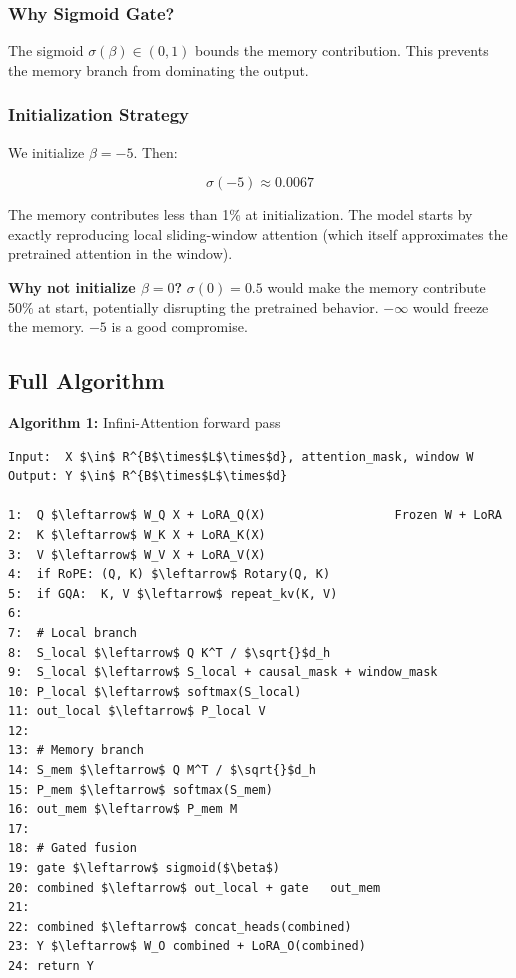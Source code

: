 \subsubsection{Why Sigmoid Gate?}

The sigmoid $\sigma(\beta) \in (0, 1)$ bounds the memory contribution. This 
prevents the memory branch from dominating the output.

\subsubsection{Initialization Strategy}

We initialize $\beta = -5$. Then:

\[
\sigma(-5) \approx 0.0067
\tag{4.8}
\]

The memory contributes less than 1\% at initialization. The model starts 
by exactly reproducing local sliding-window attention (which itself 
approximates the pretrained attention in the window).

\textbf{Why not initialize $\beta = 0$?} $\sigma(0) = 0.5$ would make the memory 
contribute 50\% at start, potentially disrupting the pretrained behavior. 
$-\infty$ would freeze the memory. $-5$ is a good compromise.

\subsection{Full Algorithm}

\textbf{Algorithm 1:} Infini-Attention forward pass
\begin{lstlisting}
Input:  X $\in$ R^{B$\times$L$\times$d}, attention_mask, window W
Output: Y $\in$ R^{B$\times$L$\times$d}

1:  Q $\leftarrow$ W_Q X + LoRA_Q(X)                  Frozen W + LoRA
2:  K $\leftarrow$ W_K X + LoRA_K(X)
3:  V $\leftarrow$ W_V X + LoRA_V(X)
4:  if RoPE: (Q, K) $\leftarrow$ Rotary(Q, K)
5:  if GQA:  K, V $\leftarrow$ repeat_kv(K, V)
6:
7:  # Local branch
8:  S_local $\leftarrow$ Q K^T / $\sqrt{}$d_h
9:  S_local $\leftarrow$ S_local + causal_mask + window_mask
10: P_local $\leftarrow$ softmax(S_local)
11: out_local $\leftarrow$ P_local V
12:
13: # Memory branch
14: S_mem $\leftarrow$ Q M^T / $\sqrt{}$d_h
15: P_mem $\leftarrow$ softmax(S_mem)
16: out_mem $\leftarrow$ P_mem M
17:
18: # Gated fusion
19: gate $\leftarrow$ sigmoid($\beta$)
20: combined $\leftarrow$ out_local + gate   out_mem
21:
22: combined $\leftarrow$ concat_heads(combined)
23: Y $\leftarrow$ W_O combined + LoRA_O(combined)
24: return Y
\end{lstlisting}

